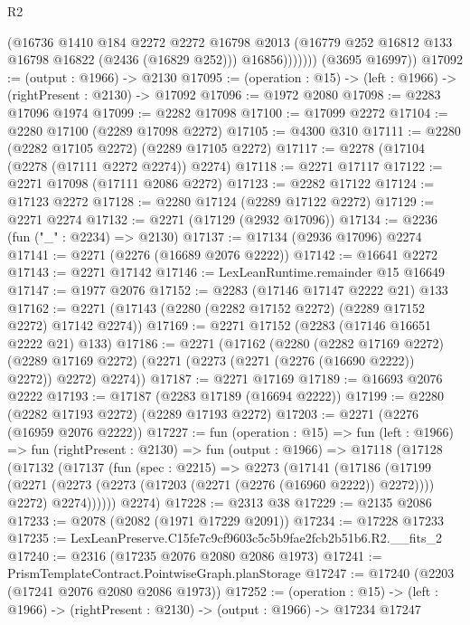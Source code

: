 \begin{lexlean}{R2}
\begin{coremodule}
                  (@16736
                    @1410
                    @184
                    @2272
                    @2272
                    @16798
                    @2013
                    (@16779 @252 @16812 @133 @16798 @16822 (@2436 (@16829 @252)))
                    @16856)))))))
      (@3695 @16997))
@17092 := (output : @1966) -> @2130
@17095 := (operation : @15) -> (left : @1966) -> (rightPresent : @2130) -> @17092
@17096 := @1972 @2080
@17098 := @2283 @17096 @1974
@17099 := @2282 @17098
@17100 := @17099 @2272
@17104 := @2280 @17100 (@2289 @17098 @2272)
@17105 := @4300 @310
@17111 := @2280 (@2282 @17105 @2272) (@2289 @17105 @2272)
@17117 := @2278 (@17104 (@2278 (@17111 @2272 @2274)) @2274)
@17118 := @2271 @17117
@17122 := @2271 @17098 (@17111 @2086 @2272)
@17123 := @2282 @17122
@17124 := @17123 @2272
@17128 := @2280 @17124 (@2289 @17122 @2272)
@17129 := @2271 @2274
@17132 := @2271 (@17129 (@2932 @17096))
@17134 := @2236 (fun ("_" : @2234) => @2130)
@17137 := @17134 (@2936 @17096) @2274
@17141 := @2271 (@2276 (@16689 @2076 @2222))
@17142 := @16641 @2272
@17143 := @2271 @17142
@17146 := LexLeanRuntime.remainder @15 @16649
@17147 := @1977 @2076
@17152 := @2283 (@17146 @17147 @2222 @21) @133
@17162 := @2271 (@17143 (@2280 (@2282 @17152 @2272) (@2289 @17152 @2272) @17142 @2274))
@17169 := @2271 @17152 (@2283 (@17146 @16651 @2222 @21) @133)
@17186 := @2271
    (@17162
      (@2280
        (@2282 @17169 @2272)
        (@2289 @17169 @2272)
        (@2271 (@2273 (@2271 (@2276 (@16690 @2222)) @2272)) @2272)
        @2274))
@17187 := @2271 @17169
@17189 := @16693 @2076 @2222
@17193 := @17187 (@2283 @17189 (@16694 @2222))
@17199 := @2280 (@2282 @17193 @2272) (@2289 @17193 @2272)
@17203 := @2271 (@2276 (@16959 @2076 @2222))
@17227 := fun (operation : @15) =>
  fun (left : @1966) =>
  fun (rightPresent : @2130) =>
  fun (output : @1966) =>
  @17118
    (@17128
      (@17132
        (@17137
          (fun (spec : @2215) =>
          @2273
            (@17141
              (@17186
                (@17199
                  (@2271 (@2273 (@2273 (@17203 (@2271 (@2276 (@16960 @2222)) @2272)))) @2272)
                  @2274))))))
      @2274)
@17228 := @2313 @38
@17229 := @2135 @2086
@17233 := @2078 (@2082 (@1971 @17229 @2091))
@17234 := @17228 @17233
@17235 := LexLeanPreserve.C15fe7c9cf9603c5c5b9fae2fcb2b51b6.R2.__fits_2
@17240 := @2316 (@17235 @2076 @2080 @2086 @1973)
@17241 := PrismTemplateContract.PointwiseGraph.planStorage
@17247 := @17240 (@2203 (@17241 @2076 @2080 @2086 @1973))
@17252 := (operation : @15) ->
  (left : @1966) -> (rightPresent : @2130) -> (output : @1966) -> @17234 @17247

\end{coremodule}
\end{lexlean}
